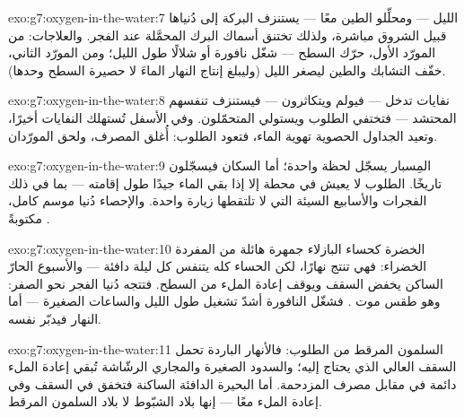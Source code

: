 \begin{solution}{exo:g7:oxygen-in-the-water:7}
 الليل ---   ومحلِّلو الطين معًا --- يستنزف
البركة إلى دُنياها قبيل الشروق مباشرة، ولذلك تختنق أسماك البرك
المحمَّلة عند الفجر. والعلاجات: من المورّد الأول، حرّك السطح ---
شغّل نافورة أو شلالًا طول الليل؛ ومن المورّد الثاني، خفّف التشابك
والطين ليصغر  الليل (وليبلغ إنتاج النهار الماءَ لا حصيرة السطح
وحدها).
\end{solution}

\begin{solution}{exo:g7:oxygen-in-the-water:8}
نفايات تدخل --- فيولم  ويتكاثرون --- فيستنزف تنفسهم
المحتشد  --- فتختفي  الطلوب ويستولي المتحمّلون. وفي
الأسفل تُستهلك النفايات أخيرًا، وتعيد الجداول الحصوية تهوية الماء،
فتعود  الطلوب: أُغلق المصرف، ولحق المورّدان.
\end{solution}

\begin{solution}{exo:g7:oxygen-in-the-water:9}
المِسبار يسجّل لحظة واحدة؛ أما السكان فيسجّلون تاريخًا. 
الطلوب لا يعيش في محطة إلا إذا بقي الماء جيدًا طول إقامته --- بما
في ذلك الفجرات والأسابيع السيئة التي لا تلتقطها زيارة واحدة.
والإحصاء دُنيا موسم كامل، مكتوبةً .
\end{solution}

\begin{solution}{exo:g7:oxygen-in-the-water:10}
الخضرة كحساء البازلاء جمهرة هائلة من  المفردة الخضراء:
فهي تنتج نهارًا، لكن الحساء كله يتنفس كل ليلة دافئة --- والأسبوع
الحارّ الساكن يخفض السقف ويوقف إعادة الملء من السطح. فتتجه دُنيا
الفجر نحو الصفر: وهو طقس موت . فشغّل النافورة أشدّ تشغيل
طول الليل والساعات الصغيرة --- أما النهار فيدبّر نفسه.
\end{solution}

\begin{solution}{exo:g7:oxygen-in-the-water:11}
السلمون المرقط من  الطلوب: فالأنهار الباردة تحمل السقف
العالي الذي يحتاج إليه؛ والسدود الصغيرة والمجاري الرشّاشة تُبقي
إعادة الملء دائمة في مقابل مصرف  المزدحمة. أما البحيرة
الدافئة الساكنة فتخفق في السقف وفي إعادة الملء معًا --- إنها بلاد
الشبّوط لا بلاد السلمون المرقط.
\end{solution}

